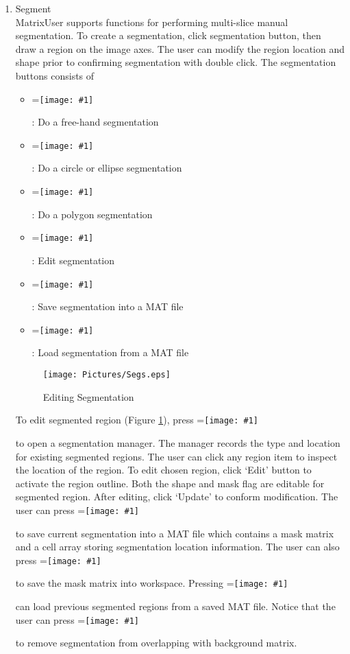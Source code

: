 \documentclass{book}%
\newcommand{\vcenteredinclude}[1]{
\begingroup
\setbox0=\hbox{\texttt{[image: \#1]}}
\parbox{\wd0}{\box0}\endgroup}
\begin{document}
\begin{enumerate}
	\item Segment \\
	
MatrixUser supports functions for performing multi-slice manual segmentation. To create a segmentation, click segmentation button, then draw a region on the image axes. The user can modify the region location and shape prior to confirming segmentation with double click. The segmentation buttons consists of
	
	\begin{itemize}
		\item \vcenteredinclude{Pictures/FreeSeg.eps} : Do a free-hand segmentation
		\item \vcenteredinclude{Pictures/CircleSeg.eps} : Do a circle or ellipse segmentation
		\item \vcenteredinclude{Pictures/PolygonSeg.eps} : Do a polygon segmentation
		\item \vcenteredinclude{Pictures/EditSeg.eps} : Edit segmentation
		\item \vcenteredinclude{Pictures/SaveSeg.eps} : Save segmentation into a MAT file
		\item \vcenteredinclude{Pictures/LoadSeg.eps} : Load segmentation from a MAT file
	\end{itemize}
	
	
\begin{figure}[htbp]
	\centering
		\texttt{[image: Pictures/Segs.eps]}
	\caption{Editing Segmentation}
	\label{fig:Segs}
\end{figure}	

To edit segmented region (Figure \ref{fig:Segs}), press \vcenteredinclude{Pictures/EditSeg.eps} to open a segmentation manager. The manager records the type and location for existing segmented regions. The user can click any region item to inspect the location of the region. To edit chosen region, click `Edit' button to activate the region outline. Both the shape and mask flag are editable for segmented region. After editing, click `Update' to conform modification. The user can press \vcenteredinclude{Pictures/SaveSeg.eps} to save current segmentation into a MAT file which contains a mask matrix and a cell array storing segmentation location information. The user can also press \vcenteredinclude{Pictures/Upload.eps} to save the mask matrix into workspace. Pressing \vcenteredinclude{Pictures/LoadSeg.eps} can load previous segmented regions from a saved MAT file. Notice that the user can press \vcenteredinclude{Pictures/Release.eps} to remove segmentation from overlapping with background matrix. 
	

\end{enumerate}
\end{document}
